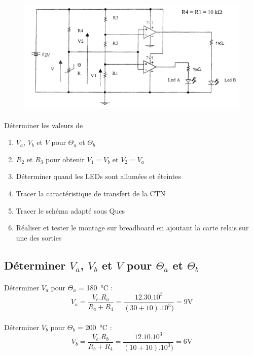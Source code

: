 \documentclass{article}
\begin{document}
\begin{figure}[H]
    \centering
    \includegraphics[width=.8\linewidth]{images/four.png}
\end{figure}

\paragraph{}
Déterminer les valeurs de
\begin{enumerate}
    \item $V_a$, $V_b$ et $V$ pour $\Theta_a$ et $\Theta_b$
    \item $R_2$ et $R_3$ pour obtenir $V_1 = V_b$ et $V_2 = V_a$
    \item Déterminer quand les LEDs sont allumées et éteintes
    \item Tracer la caractéristique de transfert de la CTN
    \item Tracer le schéma adapté sous Qucs
    \item Réaliser et tester le montage sur breadboard en ajoutant la carte relais sur une des sorties
\end{enumerate}

\subsection{Déterminer $V_a$, $V_b$ et $V$ pour $\Theta_a$ et $\Theta_b$}
\paragraph{}
Déterminer $V_a$ pour $\Theta_a$ = \SI{180}{\celsius} :
$$V_a = \frac{V_e.R_a}{R_a + R_4} = \frac{12.30.10^3}{(30 + 10).10^3)} = 9\si{\volt}$$

\paragraph{}
Déterminer $V_b$ pour $\Theta_b$ = \SI{200}{\celsius} :
$$V_b = \frac{V_e.R_b}{R_b + R_4} = \frac{12.10.10^3}{(10 + 10).10^3)} = 6\si{\volt}$$
\end{document}
